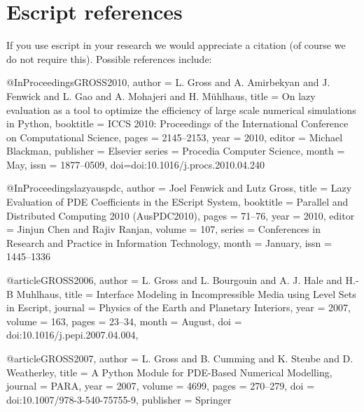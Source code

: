 
%
%
%

\chapter{Escript references}
\label{app:ourrefs}

If you use escript in your research we would appreciate a citation (of course
we do not require this). Possible references include:

\begin{shellCode}
@InProceedings{GROSS2010,
	author = {L. Gross and A. Amirbekyan and J. Fenwick and L. Gao 
	    and A. Mohajeri and H. M\"uhlhaus},
	title = {On lazy evaluation as a tool to optimize the 
	    efficiency of large scale numerical simulations in Python},
	booktitle = {ICCS 2010: Proceedings of the International 
	    Conference on Computational Science},
	pages = {2145--2153},
	year = {2010},
	editor = {Michael Blackman},
	publisher = {Elsevier}
	series = {Procedia Computer Science},
	month = {May},
	issn = {1877--0509},
	doi={doi:10.1016/j.procs.2010.04.240}
}
\end{shellCode}


\begin{shellCode}
@InProceedings{lazyauspdc,
	author = {Joel Fenwick and Lutz Gross},
	title = {Lazy Evaluation of PDE Coefficients in the EScript System},
	booktitle = {Parallel and Distributed Computing 2010 (AusPDC2010)},
	pages = {71--76},
	year = {2010},
	editor = {Jinjun Chen and Rajiv Ranjan},
	volume = {107},
	series = {Conferences in Research and Practice in Information Technology},
	month = {January},
	issn = {1445--1336}
}
\end{shellCode}

\begin{shellCode}
@article{GROSS2006,
        author = {L. Gross and L. Bourgouin and A. J. Hale and H.-B Muhlhaus},
        title = {Interface Modeling in Incompressible Media 
	using Level Sets in Escript},
        journal = {Physics of the Earth and Planetary Interiors},
        year = 2007,
        volume = {163},
        pages = {23--34},
        month = {August},
        doi = {doi:10.1016/j.pepi.2007.04.004},
}
\end{shellCode}

\begin{shellCode}
@article{GROSS2007,
	author = {L. Gross and B. Cumming and K. Steube and D. Weatherley},
	title = {A Python Module for PDE-Based Numerical Modelling},
	journal = {PARA},
	year = {2007},
	volume = {4699},
	pages = {270--279},
	doi = {doi:10.1007/978-3-540-75755-9},
	publisher = {Springer}
}
\end{shellCode}


